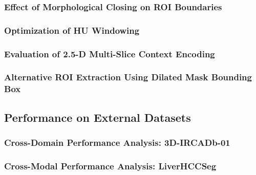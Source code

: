 \subsubsection{Effect of Morphological Closing on ROI Boundaries}


\subsubsection{Optimization of HU Windowing}


\subsubsection{Evaluation of 2.5-D Multi-Slice Context Encoding}


\subsubsection{Alternative ROI Extraction Using Dilated Mask Bounding Box}


\subsection{Performance on External Datasets}


\subsubsection{Cross-Domain Performance Analysis: 3D-IRCADb-01}


\subsubsection{Cross-Modal Performance Analysis: LiverHCCSeg}

